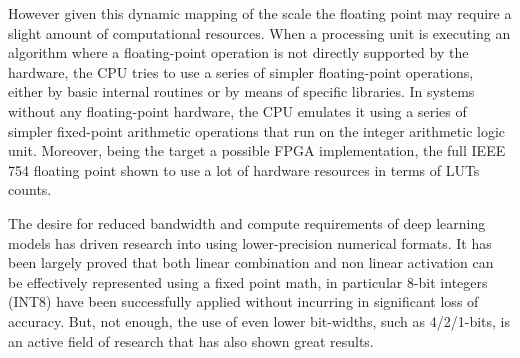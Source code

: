 However given this dynamic mapping of the scale the floating point may require a slight amount of computational resources.
When a processing unit is executing an algorithm where a floating-point operation is not directly supported by the hardware, the CPU tries to use a series of simpler floating-point operations, either by basic internal routines or by means of specific libraries. In systems without any floating-point hardware, the CPU emulates it using a series of simpler fixed-point arithmetic operations that run on the integer arithmetic logic unit.
Moreover, being the target a possible FPGA implementation, the full IEEE 754 floating point shown to use a lot of hardware resources in terms of LUTs counts. 

The desire for reduced bandwidth and compute requirements of deep learning models has driven research into using lower-precision numerical formats. It has been largely proved that both linear combination and non linear activation can be effectively represented using a fixed point math, in particular 8-bit integers (INT8) have been successfully applied without incurring in significant loss of accuracy. 
But, not enough, the use of even lower bit-widths, such as 4/2/1-bits, is an active field of research that has also shown great results.

